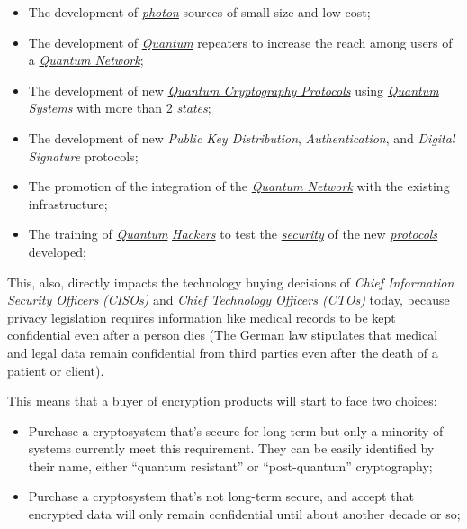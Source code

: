 \documentclass[conference]{IEEEtran}
\begin{document}
\begin{itemize}
    \item The development of \href{https://en.wikipedia.org/wiki/Photon}{\textit{photon}} sources of small size and low cost;
    \item The development of \href{https://en.wikipedia.org/wiki/Quantum}{\textit{Quantum}} repeaters to increase the reach among users of a \href{https://en.wikipedia.org/wiki/Quantum_network}{\textit{Quantum Network}};
    \item The development of new \href{https://en.wikipedia.org/wiki/List_of_quantum_key_distribution_protocols}{\textit{Quantum Cryptography Protocols}} using \href{https://en.wikipedia.org/wiki/Quantum_system}{\textit{Quantum Systems}} with more than 2 \href{https://en.wikipedia.org/wiki/Quantum_state}{\textit{states}};
    \item The development of new \textit{Public Key Distribution}, \textit{Authentication}, and \textit{Digital Signature} protocols;
    \item The promotion of the integration of the \href{https://en.wikipedia.org/wiki/Quantum_network}{\textit{Quantum Network}} with the existing infrastructure;
    \item The training of \href{https://en.wikipedia.org/wiki/Quantum}{\textit{Quantum}} \href{https://en.wikipedia.org/wiki/Hacker}{\textit{Hackers}} to test the \href{https://en.wikipedia.org/wiki/Internet_security}{\textit{security}} of the new \href{https://en.wikipedia.org/wiki/Cryptographic_protocol}{\textit{protocols}} developed;
\end{itemize}

\vspace{4pt}

This, also, directly impacts the technology buying decisions of \textit{Chief Information Security Officers (CISOs)} and \textit{Chief Technology Officers (CTOs)} today, because privacy legislation requires information like medical records to be kept confidential even after a person dies (The German law stipulates that medical and legal data remain confidential from third parties even after the death of a patient or client).

\vspace{4pt}

This means that a buyer of encryption products will start to face two choices:

\begin{itemize}
    \item Purchase a cryptosystem that's secure for long-term but only a minority of systems currently meet this requirement. They can be easily identified by their name, either “quantum resistant” or “post-quantum” cryptography;
    \item  Purchase a cryptosystem that's not long-term secure, and accept that encrypted data will only remain confidential until about another decade or so;
\end{itemize}
\end{document}
